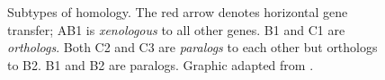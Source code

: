 \begin{figure}[h]
	\begin{center}
		\def\svgwidth{0.8\textwidth}
		
	\end{center}
	\caption[Orthology, paralogy, and xenology]{Subtypes of homology. The red
		arrow denotes horizontal gene transfer; AB1 is \emph{xenologous} to all
		other genes. B1 and C1 are \emph{orthologs}. Both C2 and C3 are
		\emph{paralogs} to each other but orthologs to B2. B1 and B2 are paralogs.
		Graphic adapted from \cite{fitch2000}.}
	\label{fig:orthology}
\end{figure}
